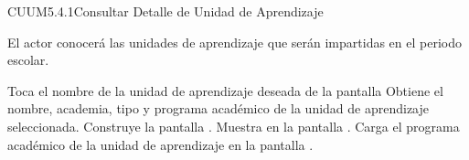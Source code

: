 \begin{UseCase}{CUUM5.4.1}{Consultar Detalle de Unidad de Aprendizaje}
{\begin{UClist}
				 El actor conocerá las unidades de aprendizaje que serán impartidas en el periodo escolar.
			\end{UClist}
		}
	\end{UseCase}
	
	
	\begin{UCtrayectoria}
		\UCpaso[\UCactor] Toca el nombre de la unidad de aprendizaje deseada de la pantalla 
		\UCpaso[\UCsist] Obtiene el nombre, academia, tipo y programa académico de la unidad de aprendizaje seleccionada.
		\UCpaso[\UCsist] Construye la pantalla .
		\UCpaso[\UCsist] Muestra en la pantalla .
		\UCpaso[\UCsist] Carga el programa académico de la unidad de aprendizaje en la pantalla .
		
	\end{UCtrayectoria}
	
	
	
	
	
